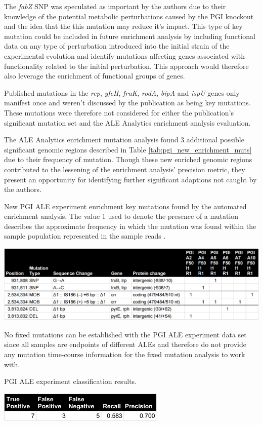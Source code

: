 \documentclass[12pt,final,masters,chapterheads]{ucsd}  %
\begin{document}
The \textit{fabZ} SNP was speculated as important by the authors due to their knowledge of the potential metabolic perturbations caused by the PGI knockout and the idea that the this mutation may reduce it's impact. This type of key mutation could be included in future enrichment analysis by including functional data on any type of perturbation introduced into the initial strain of the experimental evolution and identify mutations affecting genes associated with functionality related to the initial perturbation. This approach would therefore also leverage the enrichment of functional groups of genes.

Published mutations in the \textit{rep}, \textit{yfeH}, \textit{fruK}, \textit{rodA}, \textit{bipA} and \textit{ispU} genes only manifest once and weren't discussed by the publication as being key mutations. These mutations were therefore not considered for either the publication's significant mutation set and the ALE Analytics enrichment analysis evaluation.

The ALE Analytics enrichment mutation analysis found 3 additional possible significant genomic regions described in Table \ref{tab:pgi_new_enrichment_muts} due to their frequency of mutation. Though these new enriched genomic regions contributed to the lessening of the enrichment analysis' precision metric, they present an opportunity for identifying further significant adaptions not caught by the authors.
\begin{table}[H]
  \caption{New PGI ALE experiment enrichment key mutations found by the automated enrichment analysis. The value 1 used to denote the presence of a mutation describes the approximate frequency in which the mutation was found within the sample population represented in the sample reads \cite{breseq_paper}.}
  \centering
  \includegraphics[width=\textwidth]{pgi_new_enrichment_muts.png}
  \label{tab:pgi_new_enrichment_muts}
\end{table}
No fixed mutations can be established with the PGI ALE experiment data set since all samples are endpoints of different ALEs and therefore do not provide any mutation time-course information for the fixed mutation analysis to work with.
\begin{table}[H]
  \centering
  \caption{PGI ALE experiment classification results.}
  \includegraphics[width=0.6\textwidth]{pgi_precision_recall.png}
\end{table}
\end{document}
